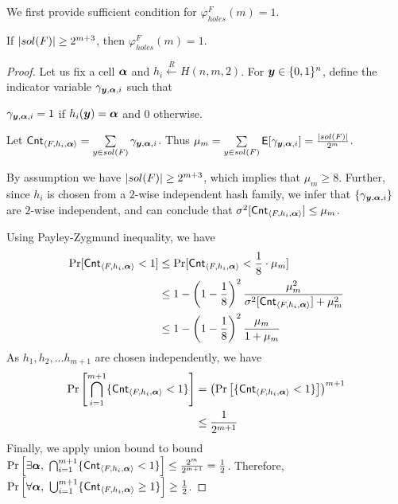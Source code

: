 We first provide sufficient condition for $\varphi_{holes}^{F}(m)  = 1$. 

\begin{lemma}[Sufficient]\label{lm:holesexist}
	If $|sol({F})| \geq 2^{m+3}$,  then $	\varphi_{holes}^{F}(m)  = 1$. 
	
\end{lemma}

\begin{proof}
	Let us fix a cell ${\boldsymbol{\alpha}}$ and $h_i \xleftarrow{R} H(n,m,2)$. For ${\boldsymbol{y}} \in \{0,1\}^n$, define the indicator variable $\gamma_{{\boldsymbol{y}},{\boldsymbol{\alpha}},i}$ such that 

$\gamma_{{\boldsymbol{y}},{\boldsymbol{\alpha}},i} = 1$ if  $h_{i}({\boldsymbol{y}}) = {\boldsymbol{\alpha}}$ and $0$ otherwise.

	Let $\mathsf{Cnt}_{\langle F, h_i,{\boldsymbol{\alpha}} \rangle} = \sum\limits_{y	\in sol({F})} \gamma_{{\boldsymbol{y}},{\boldsymbol{\alpha}},i}$. 
	Thus $\mu_{m} = \sum\limits_{y	\in sol({F})} \mathsf{E}[\gamma_{{\boldsymbol{y}},{\boldsymbol{\alpha}},i}] = \frac{|sol({F})|}{2^m}$.
	
	By assumption we have $|sol({F})| \geq 2^{m+3}$, which implies that $\mu_{m} \geq 8$. Further, since $h_i$ is chosen from a $2$-wise independent hash family, we infer that $\{\gamma_{{\boldsymbol{y}},{\boldsymbol{\alpha}},i}\}$ are $2$-wise independent, and can conclude that $\sigma^2[\mathsf{Cnt}_{\langle F, h_i,{\boldsymbol{\alpha}} \rangle}] \leq \mu_{m}$.
	
	Using Payley-Zygmund inequality, we have
	\begin{align*}
		\Pr[\Cnt{F}{h_i,\vecbold{\alpha}} < 1] &\leq \Pr[\Cnt{F}{h_i,\vecbold{\alpha}} <  \frac{1}{8} \cdot \mu_{m}] \\
		
		&
		\leq 1 - \left(1-\frac{1}{8}\right)^2\frac{\mu_{m}^2}{\sigma^2[\Cnt{F}{h_i,\vecbold{\alpha}}]+\mu_{m}^2}  \\
		
		&\leq 1 - \left(1-\frac{1}{8}\right)^2\frac{\mu_{m}}{1+\mu_{m}}   \\
		
		
	\end{align*}
		As $h_1, h_2, \ldots h_{m+1}$ are chosen independently, we have  
	\begin{align*}
		\Pr\left[\bigcap_{i=1}^{m+1} \{\mathsf{Cnt}_{\langle F, h_i,{\boldsymbol{\alpha}} \rangle} <  1 \} \right] &=\left(\Pr\left[\{\mathsf{Cnt}_{\langle F, h_i,{\boldsymbol{\alpha}} \rangle} <   1 \} \right]\right)^{m+1}  \\
		&\leq \frac{1}{2^{m+1}}
	\end{align*}  Finally, we apply union bound to bound 
	$\Pr\left[\exists \vecbold{\alpha}, \ \bigcap_{i=1}^{m+1}  \{\Cnt{F}{h_i,\vecbold{\alpha}} <   1 \} \right] \leq \frac{2^{m}}{2^{m+1}} = \frac{1}{2}$. Therefore, 
	$\Pr\left[\forall \vecbold{\alpha}, \ \bigcup_{i=1}^{m+1}  \{\Cnt{F}{h_i,\vecbold{\alpha}}  \ge  1 \} \right] \geq \frac{1}{2}$.
	

\end{proof}
